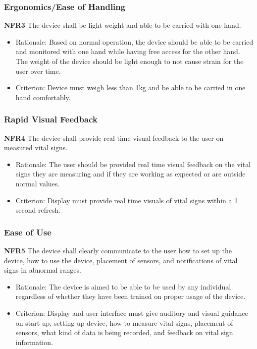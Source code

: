 \documentclass{article}
\begin{document}
    \subsubsection{Ergonomics/Ease of Handling}
    \textbf{NFR3} The device shall be light weight and able to be carried with one hand. 
    \begin{itemize}
	    \item Rationale: Based on normal operation, the device should be able to be carried and monitored with one hand while having free access for the other hand. The weight of the device should be light enough to not cause strain for the user over time. 
	    \item Criterion: Device must weigh less than 1kg and be able to be carried in one hand comfortably. 
	\end{itemize}
	
	\subsubsection{Rapid Visual Feedback }
	\textbf{NFR4} The device shall provide real time visual feedback to the user on measured vital signs.
    \begin{itemize}
	    \item Rationale: The user should be provided real time visual feedback on the vital signs they are measuring and if they are working as expected or are outside normal values.
	    \item Criterion: Display must provide real time visuals of vital signs within a 1 second refresh.
	\end{itemize}
	
	\subsubsection{Ease of Use}
	\textbf{NFR5} The device shall clearly communicate to the user how to set up the device, how to use the device, placement of sensors, and notifications of vital signs in abnormal ranges. 
    \begin{itemize}
	    \item Rationale: The device is aimed to be able to be used by any individual regardless of whether they have been trained on proper usage of the device. 
	    \item Criterion: Display and user interface must give auditory and visual guidance on start up, setting up device, how to measure vital signs, placement of sensors, what kind of data is being recorded, and feedback on vital sign information. 
	\end{itemize}
	
\end{document}
